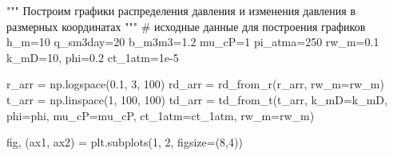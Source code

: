 \documentclass[
  russian,
  letterpaper,
  DIV=11,
  numbers=noendperiod,
  oneside]{scrartcl}
\newenvironment{Shaded}{\begin{snugshade}}{\end{snugshade}}
\newcommand{\CommentTok}[1]{\textcolor[rgb]{0.37,0.37,0.37}{#1}}
\newcommand{\DecValTok}[1]{\textcolor[rgb]{0.68,0.00,0.00}{#1}}
\newcommand{\FloatTok}[1]{\textcolor[rgb]{0.68,0.00,0.00}{#1}}
\newcommand{\NormalTok}[1]{\textcolor[rgb]{0.00,0.23,0.31}{#1}}
\newcommand{\OperatorTok}[1]{\textcolor[rgb]{0.37,0.37,0.37}{#1}}
\begin{document}
\begin{Shaded}
\begin{Highlighting}[]
\CommentTok{"""}
\CommentTok{Построим графики распределения давления и изменения давления}
\CommentTok{в размерных координатах}
\CommentTok{"""}
\CommentTok{\# исходные данные для построения графиков}
\NormalTok{h\_m}\OperatorTok{=}\DecValTok{10} 
\NormalTok{q\_sm3day}\OperatorTok{=}\DecValTok{20} 
\NormalTok{b\_m3m3}\OperatorTok{=}\FloatTok{1.2} 
\NormalTok{mu\_cP}\OperatorTok{=}\DecValTok{1} 
\NormalTok{pi\_atma}\OperatorTok{=}\DecValTok{250}
\NormalTok{rw\_m}\OperatorTok{=}\FloatTok{0.1}
\NormalTok{k\_mD}\OperatorTok{=}\DecValTok{10}\NormalTok{, }
\NormalTok{phi}\OperatorTok{=}\FloatTok{0.2}
\NormalTok{ct\_1atm}\OperatorTok{=}\FloatTok{1e{-}5}

\NormalTok{r\_arr }\OperatorTok{=}\NormalTok{ np.logspace(}\FloatTok{0.1}\NormalTok{, }\DecValTok{3}\NormalTok{, }\DecValTok{100}\NormalTok{)}
\NormalTok{rd\_arr }\OperatorTok{=}\NormalTok{ rd\_from\_r(r\_arr, rw\_m}\OperatorTok{=}\NormalTok{rw\_m)}
\NormalTok{t\_arr }\OperatorTok{=}\NormalTok{ np.linspace(}\DecValTok{1}\NormalTok{, }\DecValTok{100}\NormalTok{, }\DecValTok{100}\NormalTok{)}
\NormalTok{td\_arr }\OperatorTok{=}\NormalTok{ td\_from\_t(t\_arr, }
\NormalTok{                   k\_mD}\OperatorTok{=}\NormalTok{k\_mD, }
\NormalTok{                   phi}\OperatorTok{=}\NormalTok{phi, }
\NormalTok{                   mu\_cP}\OperatorTok{=}\NormalTok{mu\_cP, }
\NormalTok{                   ct\_1atm}\OperatorTok{=}\NormalTok{ct\_1atm, }
\NormalTok{                   rw\_m}\OperatorTok{=}\NormalTok{rw\_m)}

\NormalTok{fig, (ax1, ax2) }\OperatorTok{=}\NormalTok{ plt.subplots(}\DecValTok{1}\NormalTok{, }\DecValTok{2}\NormalTok{, figsize}\OperatorTok{=}\NormalTok{(}\DecValTok{8}\NormalTok{,}\DecValTok{4}\NormalTok{))}


\end{Highlighting}
\end{Shaded}
\end{document}

